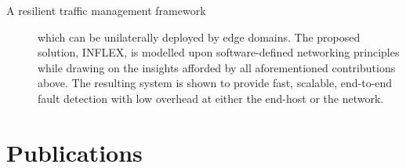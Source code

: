 \begin{description}
\item[A resilient traffic management framework] which can be unilaterally deployed by edge domains.
The proposed solution, INFLEX, is modelled upon software-defined networking principles while drawing on the insights afforded by all aforementioned contributions above.
The resulting system is shown to provide fast, scalable, end-to-end fault detection with low overhead at either the end-host or the network.
\end{description}


\section{Publications}
\label{sec:introduction:contributions}

